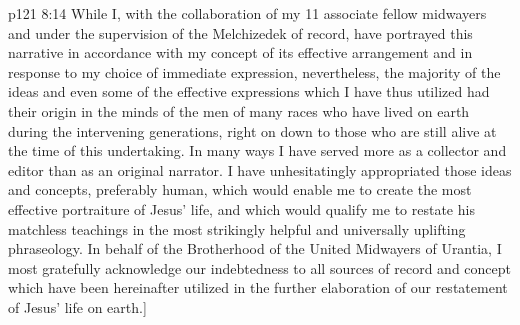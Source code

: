 \vs p121 8:14 While I, with the collaboration of my 11 associate fellow midwayers and under the supervision of the Melchizedek of record, have portrayed this narrative in accordance with my concept of its effective arrangement and in response to my choice of immediate expression, nevertheless, the majority of the ideas and even some of the effective expressions which I have thus utilized had their origin in the minds of the men of many races who have lived on earth during the intervening generations, right on down to those who are still alive at the time of this undertaking. In many ways I have served more as a collector and editor than as an original narrator. I have unhesitatingly appropriated those ideas and concepts, preferably human, which would enable me to create the most effective portraiture of Jesus’ life, and which would qualify me to restate his matchless teachings in the most strikingly helpful and universally uplifting phraseology. In behalf of the Brotherhood of the United Midwayers of Urantia, I most gratefully acknowledge our indebtedness to all sources of record and concept which have been hereinafter utilized in the further elaboration of our restatement of Jesus’ life on earth.]
\quizlink
